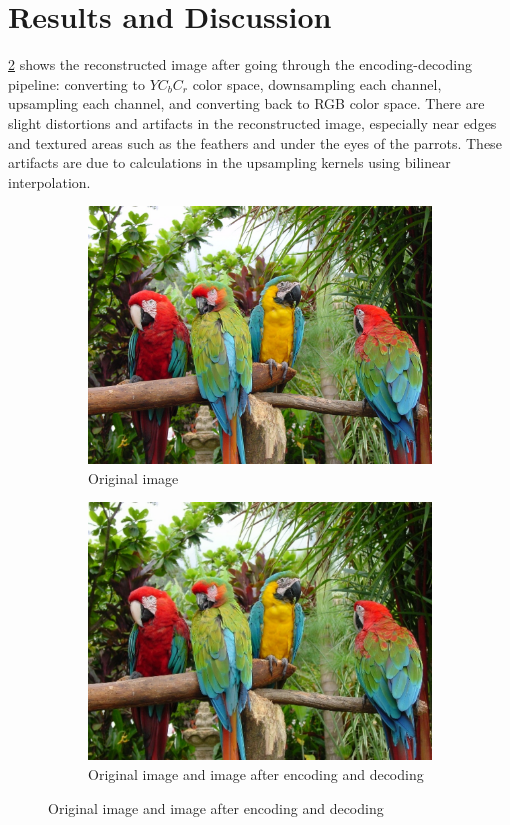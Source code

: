 \documentclass[10pt,twocolumn,letterpaper]{article}
\begin{document}
\section{Results and Discussion}
\cref{fig:upampled} shows the reconstructed image after going through the encoding-decoding pipeline: converting to $YC_bC_r$ color space, downsampling each channel, upsampling each channel, and converting back to RGB color space. There are slight distortions and artifacts in the reconstructed image, especially near edges and textured areas such as the feathers and under the eyes of the parrots. These artifacts are due to calculations in the upsampling kernels using bilinear interpolation.
\begin{figure}
  \centering
  \begin{subfigure}{0.72\linewidth}
    \includegraphics[width=\textwidth]{birds.jpg}
    \caption{Original image}
    \label{fig:original}
  \end{subfigure}
  \vfill
  \begin{subfigure}{0.72\linewidth}
    \includegraphics[width=\textwidth]{upsampled.jpg}
    \caption{Original image and image after encoding and decoding}
    \label{fig:upampled}
  \end{subfigure}
  \caption{Original image and image after encoding and decoding}
  \label{fig:birds}
\end{figure}
\end{document}
